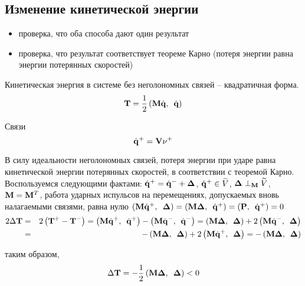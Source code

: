
\subsection{Изменение кинетической энергии}

\begin{itemize}
    \item проверка, что оба способа дают один результат
    \item проверка, что результат соответствует теореме Карно (потеря энергии равна энергии потерянных скоростей)
\end{itemize}

Кинетическая энергия в системе без неголономных связей -- квадратичная форма.
\begin{equation*}
\ke = \ddfrac{1}{2}\dotp{\mke\dotq}{\dotq}
\end{equation*}

Связи
\begin{equation*}
\dqposle = \cstr\nuposle
\end{equation*}

В силу идеальности неголономных связей, потеря энергии при ударе равна кинетической энергии потерянных скоростей, в соответствии с теоремой Карно.
Воспользуемся следующими фактами: $\dqposle = \dqdo + \deltadq$, $\dqposle \in \subspace$, $\deltadq \perp_\mke \subspace$, $\mke = \mke^T$, работа ударных испульсов на перемещениях, допускаемых вновь налагаемыми связями, равна нулю $\dotp{\mke\dqposle}{\deltadq} = \dotp{\mke\deltadq}{\dqposle} = \dotp{\mathbf{P}}{\dqposle} = 0$
\begin{eqnarray*}
2\Delta\ke & = & 2\left(\ke^+ - \ke^-\right) = \dotp{\mke\dqposle}{\dqposle} - \dotp{\mke\dqdo}{\dqdo} = \dotp{\mke\deltadq}{\deltadq} + 2\dotp{\mke\dqdo}{\deltadq} \\
 & = & -\dotp{\mke\deltadq}{\deltadq} + 2\dotp{\mke\dqposle}{\deltadq} = -\dotp{\mke\deltadq}{\deltadq}
\end{eqnarray*}

таким образом,
\begin{equation*}
\Delta\ke = -\ddfrac{1}{2}\dotp{\mke\deltadq}{\deltadq} < 0
\end{equation*}
